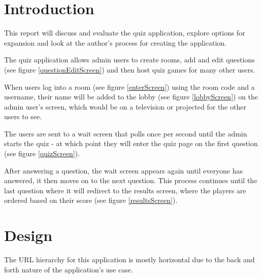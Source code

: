 \documentclass[10pt, a4paper]{article}
\title{\mytitle}
\author{\myauthor\hspace{1em}\\\contact\\Edinburgh Napier University\hspace{0.5em}-\hspace{0.5em}\mymodule}
\date{}
\newcommand{\figuremacro}[5]{
    \begin{figure}[#1]
        \centering
        \texttt{[image: \#2]}
        \caption[#3]{\textbf{#3}#4}
        \label{fig:#2}
    \end{figure}
}
\begin{document}
    \maketitle
    
    
    \section{Introduction}

    This report will discuss and evaluate the quiz application, explore options for expansion and look at the author's process for creating the application.
    
    The quiz application allows admin users to create rooms, add and edit questions (see figure \ref{questionEditScreen}) and then host quiz games for many other users. 
    
    When users log into a room (see figure \ref{enterScreen}) using the room code and a username, their name will be added to the lobby (see figure \ref{lobbyScreen}) on the admin user's screen, which would be on a television or projected for the other users to see. 
    
    The users are sent to a wait screen that polls once per second until the admin starts the quiz - at which point they will enter the quiz page on the first question (see figure \ref{quizScreen}).
    
    After answering a question, the wait screen appears again until everyone has answered, it then moves on to the next question. This process continues until the last question where it will redirect to the results screen, where the players are ordered based on their score (see figure \ref{resultsScreen}).
    
    
	\section{Design}
	The URL hierarchy for this application is mostly horizontal due to the back and forth nature of the application's use case.
	
\end{document}
